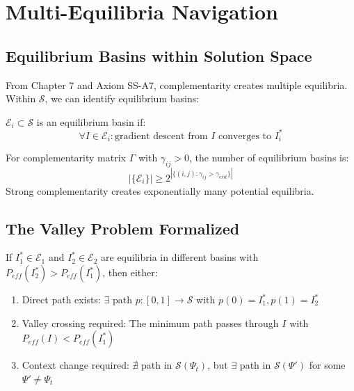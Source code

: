 \section{Multi-Equilibria Navigation}
\label{sec:ss-equilibria}

\subsection{Equilibrium Basins within Solution Space}

From Chapter 7 and Axiom SS-A7, complementarity creates multiple equilibria. Within $\mathcal{S}$, we can identify equilibrium basins:

\begin{definition}
$\mathcal{E}_i \subset \mathcal{S}$ is an equilibrium basin if:
\begin{equation}
\forall I \in \mathcal{E}_i: \text{gradient descent from } I \text{ converges to } I^*_i
\end{equation}
\end{definition}

\begin{theorem}
For complementarity matrix $\Gamma$ with $\gamma_{ij} > 0$, the number of equilibrium basins is:
\begin{equation}
|\{\mathcal{E}_i\}| \geq 2^{|\{(i,j): \gamma_{ij} > \gamma_{crit}\}|}
\end{equation}
Strong complementarity creates exponentially many potential equilibria.
\end{theorem}

\subsection{The Valley Problem Formalized}

\begin{theorem}
If $I^*_1 \in \mathcal{E}_1$ and $I^*_2 \in \mathcal{E}_2$ are equilibria in different basins with $P_{eff}(I^*_2) > P_{eff}(I^*_1)$, then either:
\begin{enumerate}
    \item Direct path exists: $\exists$ path $p: [0,1] \to \mathcal{S}$ with $p(0) = I^*_1, p(1) = I^*_2$
    \item Valley crossing required: The minimum path passes through $I$ with $P_{eff}(I) < P_{eff}(I^*_1)$
    \item Context change required: $\nexists$ path in $\mathcal{S}(\Psi_t)$, but $\exists$ path in $\mathcal{S}(\Psi')$ for some $\Psi' \neq \Psi_t$
\end{enumerate}
\end{theorem}

